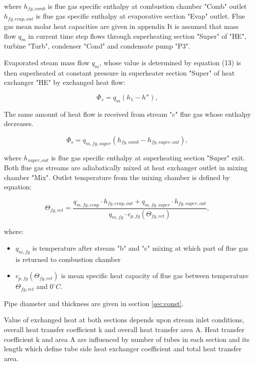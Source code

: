 \documentclass{article}
\begin{document}
	\noindent
	where 
	$h_{fg,comb}$ is flue gas specific enthalpy at combustion chamber "Comb" outlet
	$h_{fg,evap,out}$ is flue gas specific enthalpy at evaporative section "Evap" outlet.
	Flue gas mean molar heat capacities are given in appendix
	It is assumed that mass flow $q_m$ in current time step flows through superheating section "Super" of "HE", turbine "Turb", condenser "Cond" and condensate pump "P3".
	
	Evaporated steam mass flow $q_m$, whose value is determined by equation 
	(13) is then superheated at constant pressure in superheater section 
	"Super" of heat exchanger "HE" by exchanged heat flow:
	
	\begin{equation}\label{eq:evap_steam_mass3}
		\Phi_s = q_m(h_1 - h''),
	\end{equation}
	
	The same amount of heat flow is received from stream "c" flue gas whose enthalpy decreases.
	
	\begin{equation}\label{eq:evap_steam_mass4}
		\Phi_s = q_{m,fg,super} (h_{fg,comb} - h_{fg,super,out}),
	\end{equation}
	
	\noindent
	where $h_{super,out}$ is flue gas specific enthalpy at superheating section "Super" exit. Both flue gas streams are adiabatically mixed at heat exchanger outlet in mixing chamber "Mix". Outlet temperature from the mixing chamber is defined by equation:
	
	\begin{equation}\label{eq:outlet_temp}
		\Theta_{fg,ret} = \frac{q_{m,fg,evap} \cdot h_{fg,evap,out} + q_{m,fg,super} \cdot h_{fg,super,out}}{q_{m,fg} \cdot c_{p,fg} (\Theta_{fg,ret})},
	\end{equation}
	
	\noindent
	where:
	
	\begin{itemize}
		\item $q_{m,fg}$ is temperature after stream "b" and "c" mixing at which part of flue gas is returned to combustion chamber
		\item $c_{p,fg} (\Theta_{fg,ret})$ is mean specific heat capacity of flue gas between temperature $\Theta_{fg,ret}$ and $0^{\circ}C$.
	\end{itemize}
	
	Pipe diameter and thickness are given in section \ref{sec:const}.
	
	\noindent
	Value of exchanged heat at both sections depends upon stream inlet conditions, overall heat transfer coefficient k and overall heat transfer area A. Heat transfer coefficient k and area A are influenced by number of tubes in each section and its length which define tube side heat exchanger coefficient and total heat transfer area.
	
\end{document}
